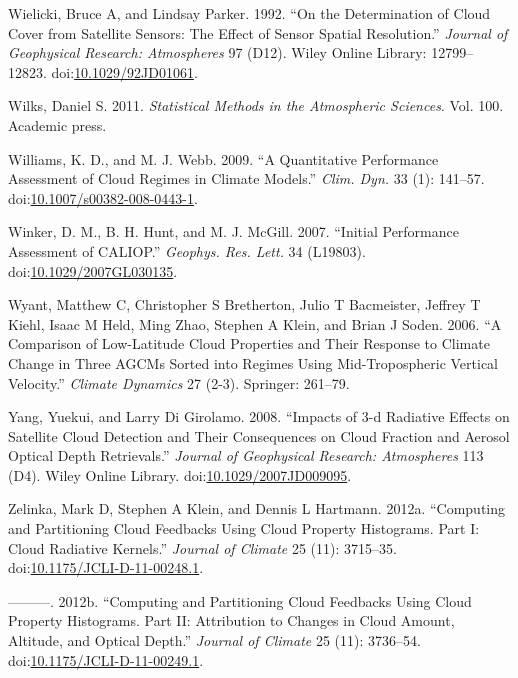 \hypertarget{ref-wielickiux5fandux5fparkerux5f1992}{}
Wielicki, Bruce A, and Lindsay Parker. 1992. ``On the Determination of
Cloud Cover from Satellite Sensors: The Effect of Sensor Spatial
Resolution.'' \emph{Journal of Geophysical Research: Atmospheres} 97
(D12). Wiley Online Library: 12799--12823.
doi:\href{https://doi.org/10.1029/92JD01061}{10.1029/92JD01061}.

\hypertarget{ref-wilksux5f2011}{}
Wilks, Daniel S. 2011. \emph{Statistical Methods in the Atmospheric
Sciences}. Vol. 100. Academic press.

\hypertarget{ref-williamsux5fandux5fwebbux5f2009}{}
Williams, K. D., and M. J. Webb. 2009. ``A Quantitative Performance
Assessment of Cloud Regimes in Climate Models.'' \emph{Clim. Dyn.} 33
(1): 141--57.
doi:\href{https://doi.org/10.1007/s00382-008-0443-1}{10.1007/s00382-008-0443-1}.

\hypertarget{ref-winkerux5fetux5falux5f2007}{}
Winker, D. M., B. H. Hunt, and M. J. McGill. 2007. ``Initial Performance
Assessment of CALIOP.'' \emph{Geophys. Res. Lett.} 34 (L19803).
doi:\href{https://doi.org/10.1029/2007GL030135}{10.1029/2007GL030135}.

\hypertarget{ref-wyantux5fetux5falux5f2006}{}
Wyant, Matthew C, Christopher S Bretherton, Julio T Bacmeister, Jeffrey
T Kiehl, Isaac M Held, Ming Zhao, Stephen A Klein, and Brian J Soden.
2006. ``A Comparison of Low-Latitude Cloud Properties and Their Response
to Climate Change in Three AGCMs Sorted into Regimes Using
Mid-Tropospheric Vertical Velocity.'' \emph{Climate Dynamics} 27 (2-3).
Springer: 261--79.

\hypertarget{ref-yangux5fandux5fdigirolamoux5f2008}{}
Yang, Yuekui, and Larry Di Girolamo. 2008. ``Impacts of 3-d Radiative
Effects on Satellite Cloud Detection and Their Consequences on Cloud
Fraction and Aerosol Optical Depth Retrievals.'' \emph{Journal of
Geophysical Research: Atmospheres} 113 (D4). Wiley Online Library.
doi:\href{https://doi.org/10.1029/2007JD009095}{10.1029/2007JD009095}.

\hypertarget{ref-zelinkaux5fetux5falux5f2012a}{}
Zelinka, Mark D, Stephen A Klein, and Dennis L Hartmann. 2012a.
``Computing and Partitioning Cloud Feedbacks Using Cloud Property
Histograms. Part I: Cloud Radiative Kernels.'' \emph{Journal of Climate}
25 (11): 3715--35.
doi:\href{https://doi.org/10.1175/JCLI-D-11-00248.1}{10.1175/JCLI-D-11-00248.1}.

\hypertarget{ref-zelinkaux5fetux5falux5f2012b}{}
---------. 2012b. ``Computing and Partitioning Cloud Feedbacks Using
Cloud Property Histograms. Part II: Attribution to Changes in Cloud
Amount, Altitude, and Optical Depth.'' \emph{Journal of Climate} 25
(11): 3736--54.
doi:\href{https://doi.org/10.1175/JCLI-D-11-00249.1}{10.1175/JCLI-D-11-00249.1}.

